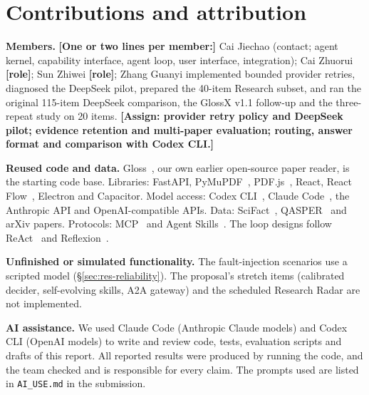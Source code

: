 \documentclass{article}
\newcommand{\gloss}{Gloss}
\newcommand{\TBD}[1]{\textcolor{glred}{\textbf{[#1]}}}
\newcommand{\code}[1]{\texttt{\small #1}}
\begin{document}
\section*{Contributions and attribution}
\label{sec:contrib}

\textbf{Members.} \TBD{One or two lines per member:} Cai Jiechao (contact; agent kernel, capability interface, agent loop, user interface, integration); Cai Zhuorui \TBD{role}; Sun Zhiwei \TBD{role}; Zhang Guanyi implemented bounded provider retries, diagnosed the DeepSeek pilot, prepared the 40-item Research subset, and ran the original 115-item DeepSeek comparison, the GlossX v1.1 follow-up and the three-repeat study on 20 items. \TBD{Assign: provider retry policy and DeepSeek pilot; evidence retention and multi-paper evaluation; routing, answer format and comparison with Codex CLI.}

\textbf{Reused code and data.} \gloss{}~\cite{gloss2026}, our own earlier open-source paper reader, is the starting code base. Libraries: FastAPI, PyMuPDF~\cite{pymupdf}, PDF.js~\cite{pdfjs}, React, React Flow~\cite{xyflow}, Electron and Capacitor. Model access: Codex CLI~\cite{codex}, Claude Code~\cite{claudecode}, the Anthropic API and OpenAI-compatible APIs. Data: SciFact~\cite{wadden2020scifact}, QASPER~\cite{dasigi2021qasper} and arXiv papers. Protocols: MCP~\cite{mcp2024} and Agent Skills~\cite{agentskills2025}. The loop designs follow ReAct~\cite{yao2023react} and Reflexion~\cite{shinn2023reflexion}.

\textbf{Unfinished or simulated functionality.} The fault-injection scenarios use a scripted model (\S\ref{sec:res-reliability}). The proposal's stretch items (calibrated decider, self-evolving skills, A2A gateway) and the scheduled Research Radar are not implemented.

\textbf{AI assistance.} We used Claude Code (Anthropic Claude models) and Codex CLI (OpenAI models) to write and review code, tests, evaluation scripts and drafts of this report. All reported results were produced by running the code, and the team checked and is responsible for every claim. The prompts used are listed in \code{AI\_USE.md} in the submission.


{\small }

\newpage
\appendix
\end{document}
